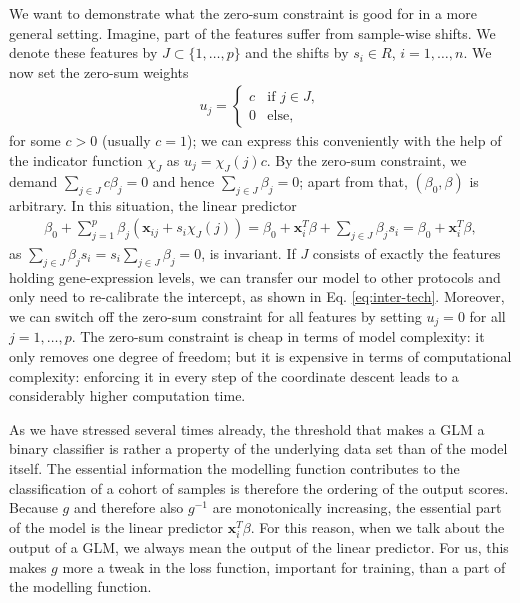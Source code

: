 We want to demonstrate what the zero-sum constraint is good for in a more general setting. Imagine, 
part of the features suffer from sample-wise 
shifts. We denote these features by $J \subset \{1, \ldots, p\}$ and the shifts by $s_i \in R$, 
$i = 1, \ldots, n$. We now set the zero-sum 
weights  
\begin{align}
    u_j =
    \begin{cases}
        c & \text{if } j \in J, \\
        0 & \text{else},
    \end{cases}
\end{align}
for some $c > 0$ (usually $c = 1$); we can express this conveniently with the help of the indicator 
function $\chi_J$ as $u_j = \chi_J(j) c$. By the zero-sum constraint, we demand 
$\sum_{j \in J} c \beta_j = 0$  
and hence $\sum_{j \in J} \beta_j = 0$; apart from that, $(\beta_0, \beta)$ is arbitrary. 
In this situation, the linear predictor 
\begin{align}\label{eq:zerosum-sample-shifts}
    \beta_0 + \sum_{j=1}^p \beta_j (\mathbf{x}_{ij} + s_i \chi_J(j))
    = \beta_0 + \mathbf{x}_i^T \beta + \sum_{j \in J} \beta_j s_i = \beta_0 + \mathbf{x}_i^T \beta,
\end{align}
as $\sum_{j \in J} \beta_j s_i = s_i \sum_{j \in J} \beta_j = 0$, is invariant. If $J$ consists of 
exactly the features holding gene-expression levels, we can transfer our model to other protocols 
and only need to re-calibrate the intercept, as shown in Eq. \eqref{eq:inter-tech}. Moreover, we 
can switch off the zero-sum constraint for all features by setting $u_j = 0$ for all 
$j = 1, \ldots, p$. The zero-sum constraint is cheap in terms of model complexity: it only removes 
one degree of freedom; but it is expensive in terms of computational complexity: enforcing it in
every step of the coordinate descent leads to a considerably higher computation time. 

As we have stressed several times already, the threshold that makes a GLM a binary classifier 
is rather a property of the underlying data set than of the model itself. The essential information 
the modelling function contributes to the classification of a cohort of samples is therefore the 
ordering of the output scores. Because $g$ and therefore also $g^{-1}$ are monotonically increasing, 
the essential part of the model is the linear predictor $\mathbf{x}_i^T \beta$. For this reason, when we 
talk about the output of a GLM, we always mean the output of the linear predictor. For us, this 
makes $g$ more a tweak in the loss function, important for training, than a part of the modelling 
function.

